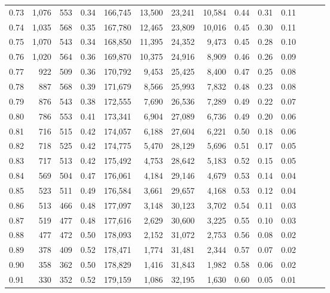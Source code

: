 \begin{tabular}{rrrrrrrrrrrrrr}
0.73 &  1,076 &  553 &  0.34 &  166,745 &   13,500 &  23,241 &  10,584 &  0.44 &  0.31 &      0.11 \\
0.74 &  1,035 &  568 &  0.35 &  167,780 &   12,465 &  23,809 &  10,016 &  0.45 &  0.30 &      0.11 \\
0.75 &  1,070 &  543 &  0.34 &  168,850 &   11,395 &  24,352 &   9,473 &  0.45 &  0.28 &      0.10 \\
0.76 &  1,020 &  564 &  0.36 &  169,870 &   10,375 &  24,916 &   8,909 &  0.46 &  0.26 &      0.09 \\
0.77 &    922 &  509 &  0.36 &  170,792 &    9,453 &  25,425 &   8,400 &  0.47 &  0.25 &      0.08 \\
0.78 &    887 &  568 &  0.39 &  171,679 &    8,566 &  25,993 &   7,832 &  0.48 &  0.23 &      0.08 \\
0.79 &    876 &  543 &  0.38 &  172,555 &    7,690 &  26,536 &   7,289 &  0.49 &  0.22 &      0.07 \\
0.80 &    786 &  553 &  0.41 &  173,341 &    6,904 &  27,089 &   6,736 &  0.49 &  0.20 &      0.06 \\
0.81 &    716 &  515 &  0.42 &  174,057 &    6,188 &  27,604 &   6,221 &  0.50 &  0.18 &      0.06 \\
0.82 &    718 &  525 &  0.42 &  174,775 &    5,470 &  28,129 &   5,696 &  0.51 &  0.17 &      0.05 \\
0.83 &    717 &  513 &  0.42 &  175,492 &    4,753 &  28,642 &   5,183 &  0.52 &  0.15 &      0.05 \\
0.84 &    569 &  504 &  0.47 &  176,061 &    4,184 &  29,146 &   4,679 &  0.53 &  0.14 &      0.04 \\
0.85 &    523 &  511 &  0.49 &  176,584 &    3,661 &  29,657 &   4,168 &  0.53 &  0.12 &      0.04 \\
0.86 &    513 &  466 &  0.48 &  177,097 &    3,148 &  30,123 &   3,702 &  0.54 &  0.11 &      0.03 \\
0.87 &    519 &  477 &  0.48 &  177,616 &    2,629 &  30,600 &   3,225 &  0.55 &  0.10 &      0.03 \\
0.88 &    477 &  472 &  0.50 &  178,093 &    2,152 &  31,072 &   2,753 &  0.56 &  0.08 &      0.02 \\
0.89 &    378 &  409 &  0.52 &  178,471 &    1,774 &  31,481 &   2,344 &  0.57 &  0.07 &      0.02 \\
0.90 &    358 &  362 &  0.50 &  178,829 &    1,416 &  31,843 &   1,982 &  0.58 &  0.06 &      0.02 \\
0.91 &    330 &  352 &  0.52 &  179,159 &    1,086 &  32,195 &   1,630 &  0.60 &  0.05 &      0.01 \\

\end{tabular}
